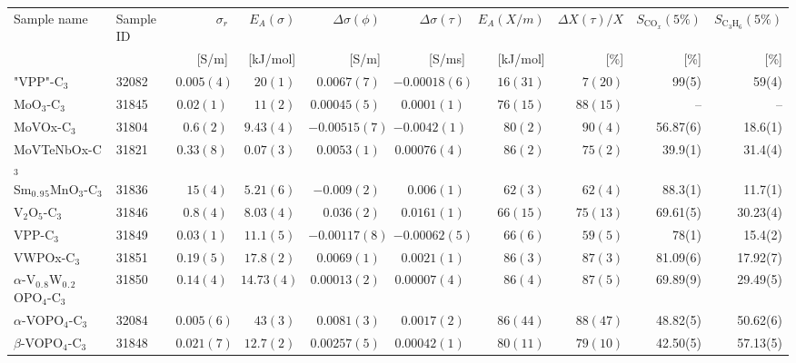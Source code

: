 \begin{tabular}{l|l|r|r|r|r|r|r|r|r}
Sample name & Sample ID & $\sigma_r$& $E_A(\sigma)$ & $\Delta \sigma (\phi)$ & $\Delta \sigma (\tau)$ & $E_A(X/m)$ & $\Delta X(\tau)/X$ & $S_{\mathrm{CO}_x}(5\%)$ & $S_{\mathrm{C}_3\mathrm{H}_6}(5\%)$\\
 & & [S/m] & [kJ/mol] & [S/m] & [S/ms] & [kJ/mol] & [\%] & [\%] & [\%]\\
\hline
"VPP"-C$_3$ & 32082 & $0.005(4)$ & $20(1)$ & $0.0067(7)$ & $-0.00018(6)$ & $16(31)$  & $7(20)$& 99(5) & 59(4)\\
MoO$_3$-C$_3$ & 31845 & $0.02(1)$ & $11(2)$ & $0.00045(5)$ & $0.0001(1)$ & $76(15)$  & $88(15)$& -- & --\\
MoVOx-C$_3$ & 31804 & $0.6(2)$ & $9.43(4)$ & $-0.00515(7)$ & $-0.0042(1)$ & $80(2)$  & $90(4)$& 56.87(6) & 18.6(1)\\
MoVTeNbOx-C$_3$ & 31821 & $0.33(8)$ & $0.07(3)$ & $0.0053(1)$ & $0.00076(4)$ & $86(2)$  & $75(2)$& 39.9(1) & 31.4(4)\\
Sm$_0$$_.$$_9$$_5$MnO$_3$-C$_3$ & 31836 & $15(4)$ & $5.21(6)$ & $-0.009(2)$ & $0.006(1)$ & $62(3)$  & $62(4)$& 88.3(1) & 11.7(1)\\
V$_2$O$_5$-C$_3$ & 31846 & $0.8(4)$ & $8.03(4)$ & $0.036(2)$ & $0.0161(1)$ & $66(15)$  & $75(13)$& 69.61(5) & 30.23(4)\\
VPP-C$_3$ & 31849 & $0.03(1)$ & $11.1(5)$ & $-0.00117(8)$ & $-0.00062(5)$ & $66(6)$  & $59(5)$& 78(1) & 15.4(2)\\
VWPOx-C$_3$ & 31851 & $0.19(5)$ & $17.8(2)$ & $0.0069(1)$ & $0.0021(1)$ & $86(3)$  & $87(3)$& 81.09(6) & 17.92(7)\\
$\alpha$-V$_0$$_.$$_8$W$_0$$_.$$_2$OPO$_4$-C$_3$ & 31850 & $0.14(4)$ & $14.73(4)$ & $0.00013(2)$ & $0.00007(4)$ & $86(4)$  & $87(5)$& 69.89(9) & 29.49(5)\\
$\alpha$-VOPO$_4$-C$_3$ & 32084 & $0.005(6)$ & $43(3)$ & $0.0081(3)$ & $0.0017(2)$ & $86(44)$  & $88(47)$& 48.82(5) & 50.62(6)\\
$\beta$-VOPO$_4$-C$_3$ & 31848 & $0.021(7)$ & $12.7(2)$ & $0.00257(5)$ & $0.00042(1)$ & $80(11)$  & $79(10)$& 42.50(5) & 57.13(5)\\
\hline
\end{tabular}
